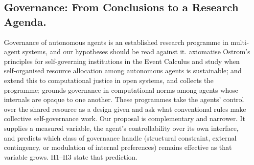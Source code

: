 \documentclass[pdflatex,sn-apa]{sn-jnl}%
\theoremstyle{definition}
\begin{document}
\subsection{Governance: From Conclusions to a Research Agenda.}

Governance of autonomous agents is an established research programme in multi-agent systems, and our hypotheses should be read against it. \citet{pittAxiomatizationSocioEconomic2012} axiomatise Ostrom's principles for self-governing institutions in the Event Calculus and study when self-organised resource allocation among autonomous agents is sustainable; \citet{pittComputationalJustice2015} and \citet{pittOpenAgentSociety2015} extend this to computational justice in open systems, and \citet{pittSelfOrganisingMAS2021} collects the programme; \citet{singhNormsGoverning2013} grounds governance in computational norms among agents whose internals are opaque to one another. These programmes take the agents' control over the shared resource as a design given and ask what conventional rules make collective self-governance work. Our proposal is complementary and narrower. It supplies a measured variable, the agent's controllability over its own interface, and predicts which class of governance handle (structural constraint, external contingency, or modulation of internal preferences) remains effective as that variable grows. H1--H3 state that prediction.
\end{document}
